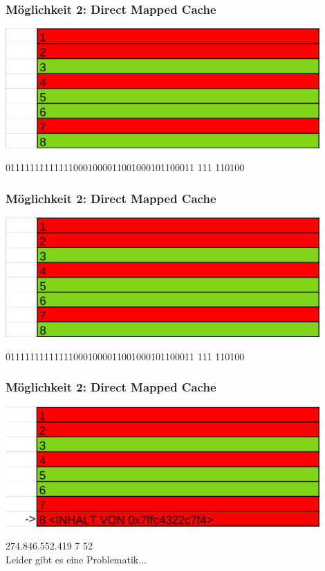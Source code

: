 \documentclass{beamer}
\begin{document}
\begin{frame}
\frametitle{M\"oglichkeit 2: Direct Mapped Cache}
\centerline{\includegraphics[width=12cm]{fac1.png}}
011111111111110001000011001000101100011 {\color{blue}111} {\color{orange}110100}
\end{frame}

\begin{frame}
\frametitle{M\"oglichkeit 2: Direct Mapped Cache}
\centerline{\includegraphics[width=12cm]{fac1.png}}
{\color{brown}011111111111110001000011001000101100011} {\color{blue}111} {\color{orange}110100}
\end{frame}

\begin{frame}
\frametitle{M\"oglichkeit 2: Direct Mapped Cache}
\centerline{\includegraphics[width=12cm]{dmc1.png}}
{\color{brown}274.846.552.419} {\color{blue}7} {\color{orange}52}\\

Leider gibt es eine Problematik...
\end{frame}
\end{document}
